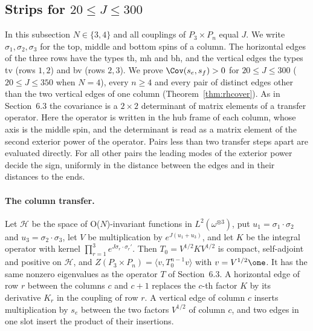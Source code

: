 \subsection{Strips for $20\le J\le300$}\label{sec:rh}

In this subsection $N\in\{3,4\}$ and all couplings of $P_3\times P_n$ equal $J$. We write $\sigma_1,\sigma_2,\sigma_3$ for the top, middle and bottom
spins of a column. The horizontal edges of the three rows have the types th, mh and bh, and the vertical edges the types tv (rows $1,2$) and bv
(rows $2,3$). We prove $\Cov(s_e,s_f)>0$ for $20\le J\le300$ ($20\le J\le350$ when $N=4$), every $n\ge4$ and every pair of distinct edges other than the two vertical edges of one
column (Theorem~\ref{thm:rhcover}). As in Section~6.3 the covariance is a $2\times2$ determinant of matrix elements of a transfer operator. Here the
operator is written in the hub frame of each column, whose axis is the middle spin, and the determinant is read as a matrix element of the second
exterior power of the operator. Pairs less than two transfer steps apart are evaluated directly. For all other pairs the leading modes of the exterior
power decide the sign, uniformly in the distance between the edges and in their distances to the ends.

\paragraph{The column transfer.}
Let $\mathcal H$ be the space of O($N$)-invariant functions in $L^2(\omega^{\otimes3})$, put $u_1=\sigma_1\cdot\sigma_2$ and $u_3=\sigma_2\cdot\sigma_3$,
let $V$ be multiplication by $e^{J(u_1+u_3)}$, and let $K$ be the integral operator with kernel $\prod_{r=1}^3e^{J\sigma_r\cdot\sigma_r'}$. Then
$T_0=V^{1/2}KV^{1/2}$ is compact, self-adjoint and positive on $\mathcal H$, and $Z(P_3\times P_n)=\langle v,T_0^{n-1}v\rangle$ with $v=V^{1/2}\one$. It
has the same nonzero eigenvalues as the operator $T$ of Section~6.3. A horizontal edge of row $r$ between the columns $c$ and $c+1$ replaces the $c$-th
factor $K$ by its derivative $K_r$ in the coupling of row $r$. A vertical edge of column $c$ inserts multiplication by $s_e$ between the two factors
$V^{1/2}$ of column $c$, and two edges in one slot insert the product of their insertions.

